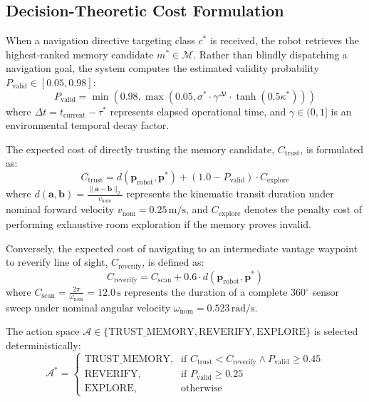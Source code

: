 \documentclass[conference]{IEEEtran}
\begin{document}
\subsection{Decision-Theoretic Cost Formulation}
When a navigation directive targeting class $c^*$ is received, the robot retrieves the highest-ranked memory candidate $m^* \in \mathcal{M}$. Rather than blindly dispatching a navigation goal, the system computes the estimated validity probability $P_{\text{valid}} \in [0.05, 0.98]$:
\begin{equation}
P_{\text{valid}} = \min\left(0.98, \max\left(0.05, \sigma^* \cdot \gamma^{\Delta t} \cdot \tanh(0.5 \kappa^*)\right)\right)
\end{equation}
where $\Delta t = t_{\text{current}} - \tau^*$ represents elapsed operational time, and $\gamma \in (0, 1]$ is an environmental temporal decay factor.

The expected cost of directly trusting the memory candidate, $C_{\text{trust}}$, is formulated as:
\begin{equation}
C_{\text{trust}} = d(\mathbf{p}_{\text{robot}}, \mathbf{p}^*) + (1.0 - P_{\text{valid}}) \cdot C_{\text{explore}}
\end{equation}
where $d(\mathbf{a}, \mathbf{b}) = \frac{\|\mathbf{a} - \mathbf{b}\|_2}{v_{\text{nom}}}$ represents the kinematic transit duration under nominal forward velocity $v_{\text{nom}} = 0.25\,\text{m/s}$, and $C_{\text{explore}}$ denotes the penalty cost of performing exhaustive room exploration if the memory proves invalid.

Conversely, the expected cost of navigating to an intermediate vantage waypoint to reverify line of sight, $C_{\text{reverify}}$, is defined as:
\begin{equation}
C_{\text{reverify}} = C_{\text{scan}} + 0.6 \cdot d(\mathbf{p}_{\text{robot}}, \mathbf{p}^*)
\end{equation}
where $C_{\text{scan}} = \frac{2\pi}{\omega_{\text{nom}}} = 12.0\,\text{s}$ represents the duration of a complete 360$^\circ$ sensor sweep under nominal angular velocity $\omega_{\text{nom}} = 0.523\,\text{rad/s}$.

The action space $\mathcal{A} \in \{\text{TRUST\_MEMORY}, \text{REVERIFY}, \text{EXPLORE}\}$ is selected deterministically:
\begin{equation}
\mathcal{A}^* = 
\begin{cases}
\text{TRUST\_MEMORY}, & \text{if } C_{\text{trust}} < C_{\text{reverify}} \land P_{\text{valid}} \ge 0.45 \\
\text{REVERIFY},     & \text{if } P_{\text{valid}} \ge 0.25 \\
\text{EXPLORE},      & \text{otherwise}
\end{cases}
\end{equation}
\end{document}
